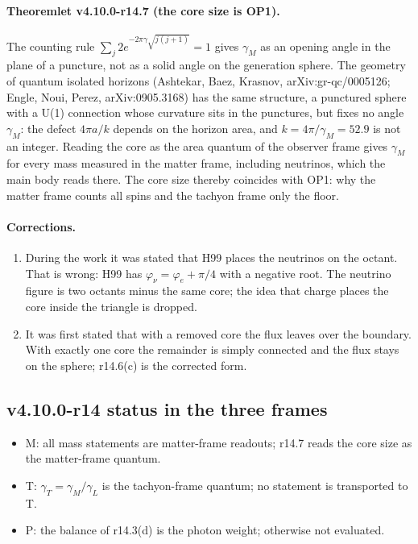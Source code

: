 \paragraph{Theoremlet v4.10.0-r14.7 (the core size is OP1).}
The counting rule \(\sum_j2e^{-2\pi\gamma\sqrt{j(j+1)}}=1\) gives \(\gamma_M\) as an opening angle in the plane of a puncture,
not as a solid angle on the generation sphere.  The geometry of quantum isolated horizons (Ashtekar, Baez, Krasnov,
arXiv:gr-qc/0005126; Engle, Noui, Perez, arXiv:0905.3168) has the same structure, a punctured sphere with a U(1)
connection whose curvature sits in the punctures, but fixes no angle \(\gamma_M\): the defect \(4\pi a/k\) depends on the horizon
area, and \(k=4\pi/\gamma_M=52.9\) is not an integer.  Reading the core as the area quantum of the observer frame gives
\(\gamma_M\) for every mass measured in the matter frame, including neutrinos, which the main body reads there.  The core size
thereby coincides with OP1: why the matter frame counts all spins and the tachyon frame only the floor.

\paragraph{Corrections.}
\begin{enumerate}[leftmargin=2em]
\item During the work it was stated that H99 places the neutrinos on the octant.  That is wrong: H99 has
\(\varphi_\nu=\varphi_e+\pi/4\) with a negative root.  The neutrino figure is two octants minus the same core; the idea that charge
places the core inside the triangle is dropped.
\item It was first stated that with a removed core the flux leaves over the boundary.  With exactly one core the remainder is
simply connected and the flux stays on the sphere; r14.6(c) is the corrected form.
\end{enumerate}

\subsection*{v4.10.0-r14 status in the three frames}
\label{subsec:v4100-r14-frames}

\begin{itemize}[leftmargin=2em]
\item M: all mass statements are matter-frame readouts; r14.7 reads the core size as the matter-frame quantum.
\item T: \(\gamma_T=\gamma_M/\gamma_L\) is the tachyon-frame quantum; no statement is transported to T.
\item P: the balance of r14.3(d) is the photon weight; otherwise not evaluated.
\end{itemize}

